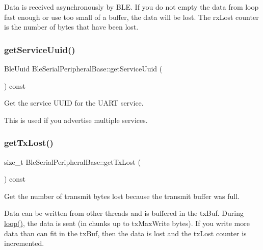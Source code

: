 Data is received asynchronously by B\+LE. If you do not empty the data from loop fast enough or use too small of a buffer, the data will be lost. The rx\+Lost counter is the number of bytes that have been lost. \mbox{\label{class_ble_serial_peripheral_base_a0457f2495023d47468a2f5b1964c0233}} 
\subsubsection{\texorpdfstring{get\+Service\+Uuid()}{getServiceUuid()}}
{\footnotesize\ttfamily Ble\+Uuid Ble\+Serial\+Peripheral\+Base\+::get\+Service\+Uuid (\begin{DoxyParamCaption}{ }\end{DoxyParamCaption}) const}



Get the service U\+U\+ID for the U\+A\+RT service. 

This is used if you advertise multiple services. \mbox{\label{class_ble_serial_peripheral_base_a09c779ad7767bc195687c525548127d9}} 
\subsubsection{\texorpdfstring{get\+Tx\+Lost()}{getTxLost()}}
{\footnotesize\ttfamily size\+\_\+t Ble\+Serial\+Peripheral\+Base\+::get\+Tx\+Lost (\begin{DoxyParamCaption}{ }\end{DoxyParamCaption}) const\hspace{0.3cm}{\ttfamily [inline]}}

Get the number of transmit bytes lost because the transmit buffer was full.

Data can be written from other threads and is buffered in the tx\+Buf. During \mbox{\hyperlink{class_ble_serial_peripheral_base_a441dc005092891279967444cb2dc2ff2}{loop()}}, the data is sent (in chunks up to tx\+Max\+Write bytes). If you write more data than can fit in the tx\+Buf, then the data is lost and the tx\+Lost counter is incremented. \mbox{\label{class_ble_serial_peripheral_base_a4dac5d6f8efb72b1df255e942a054560}} 
